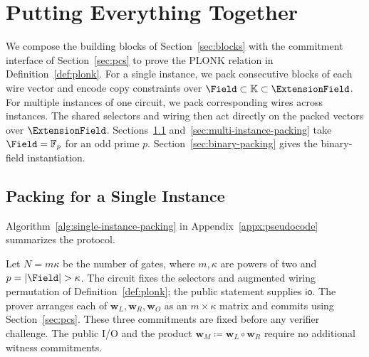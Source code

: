 \section{Putting Everything Together}
\label{sec:together}

We compose the building blocks of Section~\ref{sec:blocks}
with the commitment interface of Section~\ref{sec:pcs} to prove
the PLONK relation in Definition~\ref{def:plonk}.
For a single instance, we pack consecutive blocks of each wire
vector and encode copy constraints over
\(\Field\subset\mathbb K\subset\ExtensionField\).
For multiple instances of one circuit, we pack corresponding
wires across instances. The shared selectors and wiring then act
directly on the packed vectors over \(\ExtensionField\).
Sections~\ref{sec:plonk-packing} and~\ref{sec:multi-instance-packing}
take \(\Field=\mathbb F_p\) for an odd prime \(p\).
Section~\ref{sec:binary-packing} gives the binary-field instantiation.

\subsection{Packing for a Single Instance}
\label{sec:plonk-packing}

Algorithm~\ref{alg:single-instance-packing} in
Appendix~\ref{appx:pseudocode} summarizes the protocol.

Let \(N=m\kappa\) be the number of gates, where \(m,\kappa\)
are powers of two and \(p=|\Field|>\kappa\).
The circuit fixes the selectors and augmented wiring permutation
of Definition~\ref{def:plonk}; the public statement supplies
\(\bm{\mathsf{io}}\).
The prover arranges each of
\(\bm w_L,\bm w_R,\bm w_O\) as an \(m\times\kappa\) matrix
and commits using Section~\ref{sec:pcs}.
These three commitments are fixed before any verifier challenge.
The public I/O and the product \(\bm w_M\coloneqq\bm w_L\circ\bm w_R\)
require no additional witness commitments.

